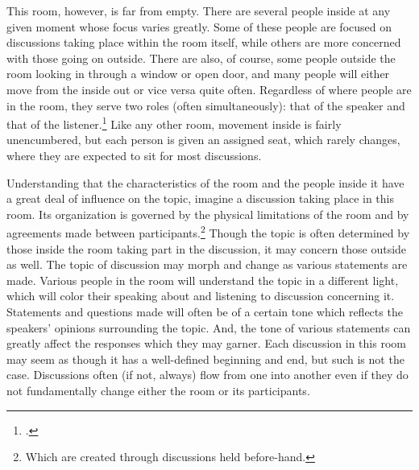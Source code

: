\documentclass{article}
\begin{document}
This room, however, is far from empty. There are several people inside at any given moment whose focus varies greatly.
Some of these people are focused on discussions taking place within the room itself, while others are more concerned with those going on outside.
There are also, of course, some people outside the room looking in through a window or open door, and many people will either move from the inside out or vice versa quite often.
Regardless of where people are in the room, they serve two roles (often simultaneously): that of the speaker and that of the listener.\footcite[4]{bickford96}
Like any other room, movement inside is fairly unencumbered, but each person is given an assigned seat, which rarely changes, where they are expected to sit for most discussions.

Understanding that the characteristics of the room and the people inside it have a great deal of influence on the topic, imagine a discussion taking place in this room.
Its organization is governed by the physical limitations of the room and by agreements made between participants.\footnote{Which are created through discussions held before-hand.}
Though the topic is often determined by those inside the room taking part in the discussion, it may concern those outside as well.
The topic of discussion may morph and change as various statements are made.
Various people in the room will understand the topic in a different light, which will color their speaking about and listening to discussion concerning it.
Statements and questions made will often be of a certain tone which reflects the speakers' opinions surrounding the topic.
And, the tone of various statements can greatly affect the responses which they may garner.
Each discussion in this room may seem as though it has a well-defined beginning and end, but such is not the case.
Discussions often (if not, always) flow from one into another even if they do not fundamentally change either the room or its participants.
\end{document}
